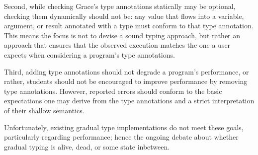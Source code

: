 Second, while checking Grace's type annotations
statically may be optional, checking them dynamically should
not be: any value that flows into a variable, argument, or result
annotated with a type must conform to that type annotation.
This means the focus is not to devise a sound typing approach,
but rather an approach that ensures that the observed execution matches
the one a user expects when considering a program's type annotations.

Third, adding type
annotations should not degrade a program's performance, or rather,
students should not be encouraged to improve performance by removing
type annotations.
However, reported errors should conform to the basic expectations one
may derive from the type annotations
and a strict interpretation of their shallow semantics.

Unfortunately, existing gradual type
implementations do not meet these goals, particularly regarding
performance; hence the ongoing debate about whether gradual typing is
alive, dead, or some state
inbetween\citep{Takikawa2016,Vitousek2017,Muehlboeck2017,Bauman2017,Richards2017,Greenman2018}.






